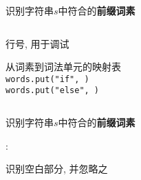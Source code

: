 \begin{frame}{}
  \begin{center}
    识别字符串$s$中符合的{\bf 前缀词素}

    \vspace{0.20cm}

    \vspace{0.30cm}
    \begin{columns}
        \begin{description}
          \setlength{\itemsep}{8pt}
          \item[line:] 行号, 用于调试
          \item[peek:] 
          \item[words:] 从词素到词法单元的映射表 \\[5pt]
            \texttt{words.put("if", \ifkw)} \\
            \texttt{words.put("else", \elsekw)}
        \end{description}
    \end{columns}
  \end{center}
\end{frame}

\begin{frame}{}
  \begin{center}
    识别字符串$s$中符合的{\bf 前缀词素}

    \vspace{0.50cm}
    \ws: \blank \quad \tab \quad \line

    \pause
    \vspace{0.50cm}

    识别空白部分, 并忽略之

    \pause
    \vspace{0.50cm}
  \end{center}
\end{frame}

